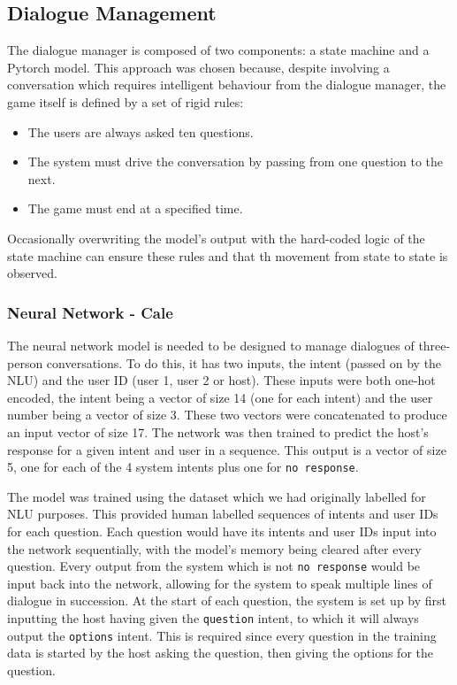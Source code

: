 \documentclass[hidelinks, 11pt]{article}
\begin{document}
\subsection{Dialogue Management}
\label{subsec:dialogue_management}

The dialogue manager is composed of two components: a state machine and a Pytorch model. This approach was chosen because, despite involving a conversation which requires intelligent behaviour from the dialogue manager, the game itself is defined by a set of rigid rules:
\begin{itemize}
  \item The users are always asked ten questions.
  \item The system must drive the conversation by passing from one question to the next.
  \item The game must end at a specified time.
\end{itemize}
\noindent Occasionally overwriting the model's output with the hard-coded logic of the state machine can ensure these rules and that th movement from state to state is observed.

\subsubsection{Neural Network - Cale}
\label{subsec:nn}
The neural network model is needed to be designed to manage dialogues of three-person conversations. To do this, it has two inputs, the intent (passed on by the NLU) and the user ID (user 1, user 2 or host). These inputs were both one-hot encoded, the intent being a vector of size 14 (one for each intent) and the user number being a vector of size 3. These two vectors were concatenated to produce an input vector of size 17. The network was then trained to predict the host's response for a given intent and user in a sequence. This output is a vector of size 5, one for each of the 4 system intents plus one for \verb|no response|.

The model was trained using the dataset which we had originally labelled for NLU purposes. This provided human labelled sequences of intents and user IDs for each question. Each question would have its intents and user IDs input into the network sequentially, with the model's memory being cleared after every question. Every output from the system which is not \verb|no response| would be input back into the network, allowing for the system to speak multiple lines of dialogue in succession. At the start of each question, the system is set up by first inputting the host having given the \verb|question| intent, to which it will always output the \verb|options| intent. This is required since every question in the training data is started by the host asking the question, then giving the options for the question.
\end{document}

